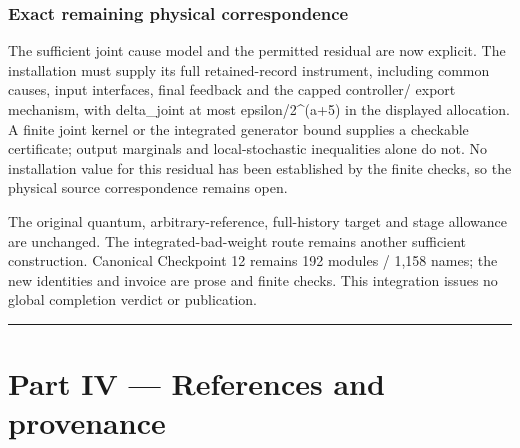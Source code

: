\documentclass[
]{article}
\begin{document}
\subsubsection{Exact remaining physical
correspondence}\label{exact-remaining-physical-correspondence}

The sufficient joint cause model and the permitted residual are now
explicit. The installation must supply its full retained-record
instrument, including common causes, input interfaces, final feedback
and the capped controller/ export mechanism, with delta\_joint at most
e\allowbreak{}p\allowbreak{}s\allowbreak{}i\allowbreak{}l\allowbreak{}o\allowbreak{}n\allowbreak{}/\allowbreak{}2\allowbreak{}\^{}\allowbreak{}(\allowbreak{}a\allowbreak{}+\allowbreak{}5\allowbreak{})
in the displayed allocation. A finite joint kernel or the integrated
generator bound supplies a checkable certificate; output marginals and
local-stochastic inequalities alone do not. No installation value for
this residual has been established by the finite checks, so the physical
source correspondence remains open.

The original quantum, arbitrary-reference, full-history target and stage
allowance are unchanged. The integrated-bad-weight route remains another
sufficient construction. Canonical Checkpoint 12 remains 192 modules /
1,158 names; the new identities and invoice are prose and finite checks.
This integration issues no global completion verdict or publication.

\begin{center}\rule{0.5\linewidth}{0.5pt}\end{center}

\section{Part IV --- References and
provenance}\label{part-iv-references-and-provenance}
\end{document}
